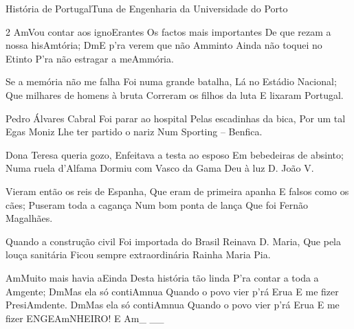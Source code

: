 \begin{musica}{História de Portugal}{Tuna de Engenharia da Universidade do Porto}{}
\begin{multicols}{2}
\ac{Am}{Vou} contar aos igno\ac{E}{ran}tes
Os factos mais importantes
De que rezam a nossa his\ac{Am}{tó}ria;
\ac{Dm}{E} p’ra verem que não \ac{Am}{min}to
Ainda não toquei no \ac{E}{tin}to
P’ra não estragar a me\ac{Am}{mó}ria.

Se a memória não me falha
Foi numa grande batalha,
Lá no Estádio Nacional;
Que milhares de homens à bruta
Correram os filhos da luta
E lixaram Portugal.

Pedro Álvares Cabral
Foi parar ao hospital
Pelas escadinhas da bica,
Por um tal Egas Moniz
Lhe ter partido o nariz
Num Sporting – Benfica.

Dona Teresa queria gozo,
Enfeitava a testa ao esposo
Em bebedeiras de absinto;
Numa ruela d’Alfama
Dormiu com Vasco da Gama
Deu à luz D. João V.

Vieram então os reis de Espanha,
Que eram de primeira apanha
E falsos como os cães;
Puseram toda a cagança
Num bom ponta de lança
Que foi Fernão Magalhães.

Quando a construção civil
Foi importada do Brasil
Reinava D. Maria,
Que pela louça sanitária
Ficou sempre extraordinária
Rainha Maria Pia.

\ac{Am}{Mui}to mais havia a\ac{E}{in}da
Desta história tão linda
P’ra contar a toda a \ac{Am}{gen}te;
\ac{Dm}{Mas} ela só conti\ac{Am}{nua}
Quando o povo vier p’rá \ac{E}{rua}
E me fizer Presi\ac{Am}{den}te.
\ac{Dm}{Mas} ela só conti\ac{Am}{nua}
Quando o povo vier p’rá \ac{E}{rua}
E me fizer ENGE\ac{Am}{NHEI}RO! \ac{E Am}{}_ __
\end{multicols}

\end{musica}
